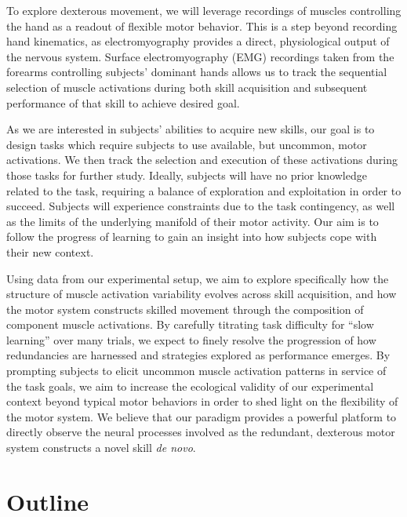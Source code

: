 \documentclass[../main.tex]{subfiles}
\begin{document}
To explore dexterous movement, we will leverage recordings of muscles controlling the hand as a readout of flexible motor behavior. This is a step beyond recording hand kinematics, as electromyography provides a direct, physiological output of the nervous system. Surface electromyography (EMG) recordings taken from the forearms controlling subjects' dominant hands allows us to track the sequential selection of muscle activations during both skill acquisition and subsequent performance of that skill to achieve desired goal.

As we are interested in subjects' abilities to acquire new skills, our goal is to design tasks which require subjects to use available, but uncommon, motor activations. We then track the selection and execution of these activations during those tasks for further study. Ideally, subjects will have no prior knowledge related to the task, requiring a balance of exploration and exploitation in order to succeed. Subjects will experience constraints due to the task contingency, as well as the limits of the underlying manifold of their motor activity. Our aim is to follow the progress of learning to gain an insight into how subjects cope with their new context.

Using data from our experimental setup, we aim to explore specifically how the structure of muscle activation variability evolves across skill acquisition, and how the motor system constructs skilled movement through the composition of component muscle activations. By carefully titrating task difficulty for ``slow learning'' over many trials, we expect to finely resolve the progression of how redundancies are harnessed and strategies explored as performance emerges. By prompting subjects to elicit uncommon muscle activation patterns in service of the task goals, we aim to increase the ecological validity of our experimental context beyond typical motor behaviors in order to shed light on the flexibility of the motor system. We believe that our paradigm provides a powerful platform to directly observe the neural processes involved as the redundant, dexterous motor system constructs a novel skill \textit{de novo}.














\section{Outline}
\end{document}

